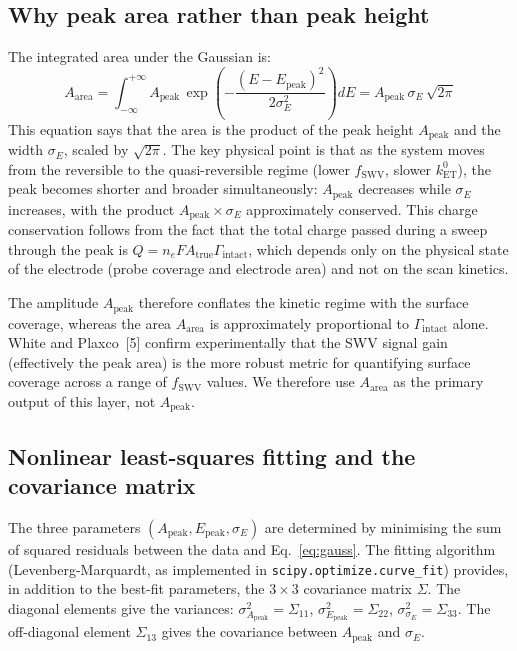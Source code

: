\documentclass[10pt,a4paper]{article}
\numberwithin{equation}{section}
\newcommand{\cit}[1]{[#1]}
\newcommand{\kET}{k_{\text{ET}}^{0}}
\newcommand{\Apk}{A_{\text{peak}}}
\newcommand{\Aarea}{A_{\text{area}}}
\newcommand{\Epk}{E_{\text{peak}}}
\begin{document}
\subsection{Why peak area rather than peak height}

The integrated area under the Gaussian is:
\begin{equation}
  \Aarea = \int_{-\infty}^{+\infty} \Apk\,
  \exp\!\!\left(-\frac{(E-\Epk)^2}{2\sigma_E^2}\right)\!dE
  = \Apk\,\sigma_E\,\sqrt{2\pi}
  \label{eq:area}
\end{equation}
This equation says that the area is the product of the peak height $\Apk$
and the width $\sigma_E$, scaled by $\sqrt{2\pi}$. The key physical point
is that as the system moves from the reversible to the quasi-reversible
regime (lower $f_\text{SWV}$, slower $\kET$), the peak becomes shorter and
broader simultaneously: $\Apk$ decreases while $\sigma_E$ increases, with
the product $\Apk \times \sigma_E$ approximately conserved. This charge
conservation follows from the fact that the total charge passed during a
sweep through the peak is $Q = n_e F A_\text{true} \Gamma_\text{intact}$,
which depends only on the physical state of the electrode (probe coverage
and electrode area) and not on the scan kinetics.

The amplitude $\Apk$ therefore conflates the kinetic regime with the surface
coverage, whereas the area $\Aarea$ is approximately proportional to
$\Gamma_\text{intact}$ alone. White and Plaxco~\cit{5} confirm
experimentally that the SWV signal gain (effectively the peak area) is
the more robust metric for quantifying surface coverage across a range of
$f_\text{SWV}$ values. We therefore use $\Aarea$ as the primary output
of this layer, not $\Apk$.

\subsection{Nonlinear least-squares fitting and the covariance matrix}

The three parameters $(\Apk, \Epk, \sigma_E)$ are determined by minimising
the sum of squared residuals between the data and Eq.~\eqref{eq:gauss}.
The fitting algorithm (Levenberg-Marquardt, as implemented in
\texttt{scipy.optimize.curve\_fit}) provides, in addition to the best-fit
parameters, the $3\times3$ covariance matrix $\Sigma$. The diagonal
elements give the variances: $\sigma_{\Apk}^2 = \Sigma_{11}$,
$\sigma_{\Epk}^2 = \Sigma_{22}$, $\sigma_{\sigma_E}^2 = \Sigma_{33}$.
The off-diagonal element $\Sigma_{13}$ gives the covariance between
$\Apk$ and $\sigma_E$.
\end{document}
